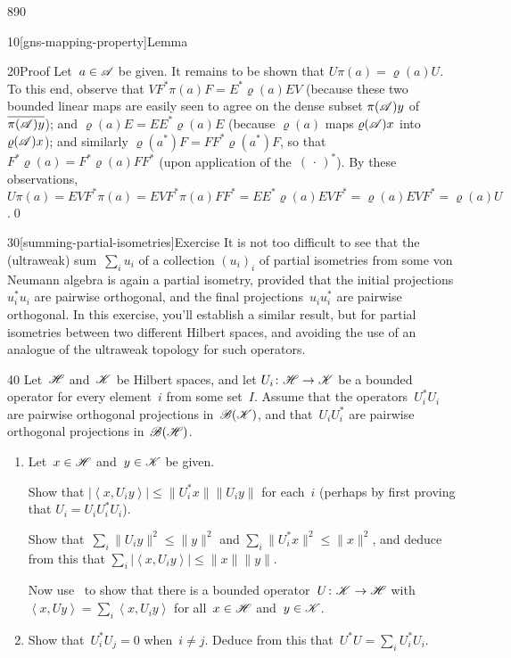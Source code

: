 \begin{parsec}{890}
\begin{point}{10}[gns-mapping-property]{Lemma}
\begin{point}{20}{Proof}
Let~$a\in\mathscr{A}$ be given.
It remains to be shown that
$U\pi(a)=\varrho(a)U$.
To this end,
observe that
$V F^* \pi(a) F = E^* \varrho(a) E V$
(because 
these two bounded linear maps
are easily seen to
agree on the dense subset $\pi(\mathscr{A})y$
of $\overline{\pi(\mathscr{A})y}$);
and $\varrho(a)E = EE^*\varrho(a)E$
(because $\varrho(a)$ maps $\varrho(\mathscr{A})x$ into~$\varrho(\mathscr{A})x$);
and similarly $\varrho(a^*)F=FF^*\varrho(a^*) F$,
so that $F^*\varrho(a) = F^* \varrho(a) FF^*$
(upon application of the~$(\,\cdot\,)^*$).
By these observations,  $U\pi(a)=
EVF^*\pi(a)=EVF^*\pi(a) FF^*
= EE^*\varrho(a)EVF^*
= \varrho(a)EVF^*
= \varrho(a)U$.\qed
\end{point}
\end{point}
\begin{point}{30}[summing-partial-isometries]{Exercise}%
It is not too difficult 
to see that the (ultraweak) sum~$\sum_i u_i$
of a collection $(u_i)_i$ 
of partial isometries from some von Neumann algebra
is again a partial isometry, 
provided that the initial projections $u_i^*u_i$
are pairwise orthogonal,
and the final projections~$u_iu_i^*$ are pairwise orthogonal.
In this exercise, you'll establish a similar result,
but for partial isometries between two different Hilbert spaces,
and avoiding the use of an analogue of 
the ultraweak topology for such operators.
\begin{point}{40}%
Let~$\mathscr{H}$ and~$\mathscr{K}$ be Hilbert spaces,
and 
let $U_i\colon \mathscr{H}\to\mathscr{K}$
be a bounded operator
for every element~$i$ from some set~$I$.
Assume that the operators~$U_i^*U_i$
are pairwise orthogonal projections in~$\mathscr{B}(\mathscr{K})$,
and that~$U_iU_i^*$ are pairwise orthogonal projections in~$\mathscr{B}(\mathscr{H})$.
\begin{enumerate}
\item
Let~$x\in\mathscr{H}$ and~$y\in\mathscr{K}$ be given.

Show that
$\left|\left<x,U_iy\right>\right|
\leq \|U_i^*x\| \|U_i y \|$
for each~$i$
(perhaps by first proving that  $U_i = U_i U_i^* U_i$).

Show that~$\sum_i \|U_i y\|^2 \leq \|y\|^2$
and $\sum_i \|U_i^* x\|^2\leq \|x\|^2$,
and deduce from this
that $\sum_i \left|\left<x,U_i y\right>\right| \leq \|x\|\|y\|$.

Now use~
to show that there is a bounded operator~$U\colon \mathscr{K}\to\mathscr{H}$
with $\left<x,Uy\right>
= \sum_i \left<x,U_iy\right>$
for all~$x\in\mathscr{H}$ and~$y\in \mathscr{K}$.
\item
Show that~$U_i^*U_j = 0$ when~$i\neq j$.
Deduce from this that~$U^*U = \sum_i U_i^* U_i$.


\end{enumerate}
\end{point}
\end{point}
\end{parsec}
